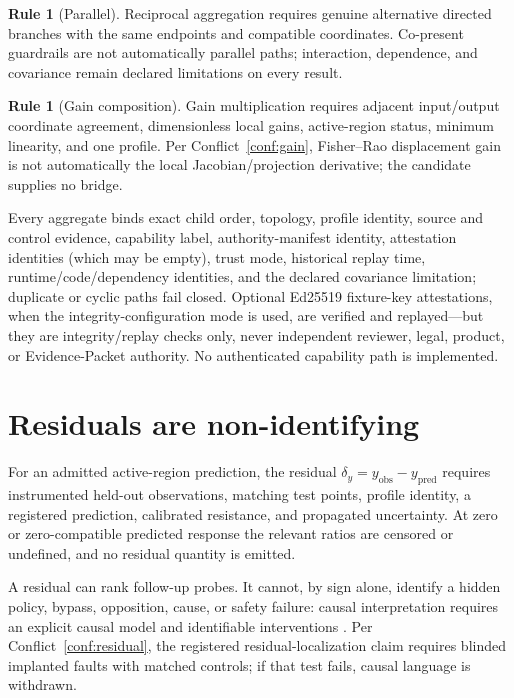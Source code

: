 \documentclass[11pt]{amsart}
\theoremstyle{definition}
\newtheorem{ruleenv}[theorem]{Rule}
\theoremstyle{remark}
\begin{document}
\begin{ruleenv}[Parallel]\label{rule:parallel}
Reciprocal aggregation requires genuine alternative directed branches with the same endpoints and compatible coordinates. Co-present guardrails are not automatically parallel paths; interaction, dependence, and covariance remain declared limitations on every result.
\end{ruleenv}

\begin{ruleenv}[Gain composition]\label{rule:gain}
Gain multiplication requires adjacent input/output coordinate agreement, dimensionless local gains, active-region status, minimum linearity, and one profile. Per Conflict~\ref{conf:gain}, Fisher--Rao displacement gain is not automatically the local Jacobian/projection derivative; the candidate supplies no bridge.
\end{ruleenv}

Every aggregate binds exact child order, topology, profile identity, source and control evidence, capability label, authority-manifest identity, attestation identities (which may be empty), trust mode, historical replay time, runtime/code/dependency identities, and the declared covariance limitation; duplicate or cyclic paths fail closed. Optional Ed25519 fixture-key attestations, when the integrity-configuration mode is used, are verified and replayed---but they are integrity/replay checks only, never independent reviewer, legal, product, or Evidence-Packet authority. No authenticated capability path is implemented.

\section{Residuals are non-identifying}\label{sec:residuals}

For an admitted active-region prediction, the residual $\delta_y=y_{\mathrm{obs}}-y_{\mathrm{pred}}$ requires instrumented held-out observations, matching test points, profile identity, a registered prediction, calibrated resistance, and propagated uncertainty. At zero or zero-compatible predicted response the relevant ratios are censored or undefined, and no residual quantity is emitted.

A residual can rank follow-up probes. It cannot, by sign alone, identify a hidden policy, bypass, opposition, cause, or safety failure: causal interpretation requires an explicit causal model and identifiable interventions \cite{pearl}. Per Conflict~\ref{conf:residual}, the registered residual-localization claim requires blinded implanted faults with matched controls; if that test fails, causal language is withdrawn.
\end{document}
